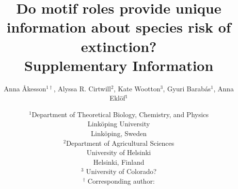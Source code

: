 \documentclass[12pt]{article}
\begin{document}
 

\title{Do motif roles provide unique information about species risk of extinction?\\ \medskip Supplementary Information}


\author{Anna \r{A}kesson$^{1\dagger}$, Alyssa R. Cirtwill$^{2}$, Kate Wootton$^{3}$, Gyuri Barab\'{a}s$^{1}$, Anna Ekl\"{o}f$^{1}$} 
\date{\small$^1$Department of Theoretical Biology, Chemistry, and Physics\\ 
Link\"{o}ping University\\
Link\"{o}ping, Sweden\\
\medskip
\small$^2$Department of Agricultural Sciences\\
University of Helsinki\\
Helsinki, Finland\\
\medskip
\small$^3$ University of Colorado?\\
\medskip
$^\dagger$ Corresponding author:\\
}



\maketitle 
\raggedright
\end{document}
